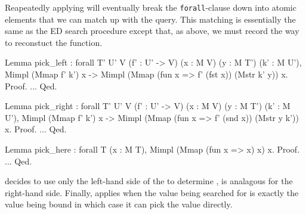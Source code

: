 \documentclass[preprint]{sigplanconf}
\newcommand{\ltac}[0]{\ensuremath{\mathcal{L}_{\mathrm{tac}}}}
\begin{document}
Reapeatedly applying  will eventually break the {\tt forall}-clause down into atomic elements that we can match up with the query.
This matching is essentially the same as the ED search procedure except that, as above, we must record the way to reconstuct the  function.
\begin{coq}
Lemma pick_left
: forall {T' U' V} (f' : U' -> V) (x : M V) (y : M T') (k' : M U'),
  Mimpl (Mmap f' k') x ->
  Mimpl (Mmap (fun x => f' (fst x)) (Mstr k' y)) x.
Proof. ... Qed.

Lemma pick_right
: forall {T' U' V} (f' : U' -> V) (x : M V) (y : M T') (k' : M U'),
  Mimpl (Mmap f' k') x ->
  Mimpl (Mmap (fun x => f' (snd x)) (Mstr y k')) x.
Proof. ... Qed.

Lemma pick_here
: forall {T} (x : M T), Mimpl (Mmap (fun x => x) x) x.
Proof. ... Qed.
\end{coq}
 decides to use only the left-hand side of the  to determine ,  is analagous for the right-hand side.
Finally,  applies when the value being searched for is exactly the value being bound in which case it can pick the value directly.

\end{document}
